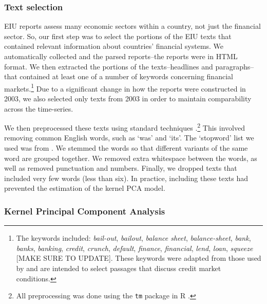 \documentclass[]{article}
\begin{document}
\subsubsection{Text selection}\label{text-selection}

EIU reports assess many economic sectors within a country,
not just the financial sector. So, our first step was to select the
portions of the EIU texts that contained relevant information about
countries' financial systems. We automatically collected and the parsed
reports--the reports were in HTML format. We then extracted the portions
of the texts--headlines and paragraphs--that contained at least one of a
number of keywords concerning financial markets.\footnote{The
  keywords included: \emph{bail-out}, \emph{bailout}, \emph{balance
  sheet}, \emph{balance-sheet}, \emph{bank}, \emph{banks},
  \emph{banking}, \emph{credit}, \emph{crunch}, \emph{default},
  \emph{finance}, \emph{financial}, \emph{lend}, \emph{loan},
  \emph{squeeze} {[}MAKE SURE TO UPDATE{]}. These keywords were adapted
  from those used by \cite{Romer2015} and are intended to
  select passages that discuss credit market conditions.} Due to a
significant change in how the reports were constructed in 2003, we also
selected only texts from 2003 in order to maintain comparability across
the time-series.

We then preprocessed these texts using standard techniques \citep[see][]{Grimmer2013}.\footnote{All preprocessing was done using the \texttt{tm} package \citep{tm2015} in R \citep{R-cite}.} This involved removing common English words, such as `was' and `its'. The `stopword' list we used was from \cite{dhillon:modha:mlj01}. We stemmed the words so that different variants of the same word are grouped together. We removed extra whitespace between the words, as well as removed punctuation and numbers. Finally, we dropped texts that included very few words (less than six). In practice, including these texts had prevented the estimation of the kernel PCA model.

\subsubsection{Kernel Principal Component
Analysis}\label{kernel-principal-component-analysis}
\end{document}
